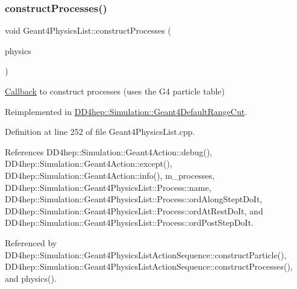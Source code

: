 \subsubsection{\texorpdfstring{construct\+Processes()}{constructProcesses()}}
{\footnotesize\ttfamily void Geant4\+Physics\+List\+::construct\+Processes (\begin{DoxyParamCaption}\item[{G4\+V\+User\+Physics\+List $\ast$}]{physics }\end{DoxyParamCaption})\hspace{0.3cm}{\ttfamily [virtual]}}



\hyperlink{class_d_d4hep_1_1_callback}{Callback} to construct processes (uses the G4 particle table) 



Reimplemented in \hyperlink{class_d_d4hep_1_1_simulation_1_1_geant4_default_range_cut_a5625f1bf8f0c47bb6b29c73ce3e590eb}{D\+D4hep\+::\+Simulation\+::\+Geant4\+Default\+Range\+Cut}.



Definition at line 252 of file Geant4\+Physics\+List.\+cpp.



References D\+D4hep\+::\+Simulation\+::\+Geant4\+Action\+::debug(), D\+D4hep\+::\+Simulation\+::\+Geant4\+Action\+::except(), D\+D4hep\+::\+Simulation\+::\+Geant4\+Action\+::info(), m\+\_\+processes, D\+D4hep\+::\+Simulation\+::\+Geant4\+Physics\+List\+::\+Process\+::name, D\+D4hep\+::\+Simulation\+::\+Geant4\+Physics\+List\+::\+Process\+::ord\+Along\+Stept\+Do\+It, D\+D4hep\+::\+Simulation\+::\+Geant4\+Physics\+List\+::\+Process\+::ord\+At\+Rest\+Do\+It, and D\+D4hep\+::\+Simulation\+::\+Geant4\+Physics\+List\+::\+Process\+::ord\+Post\+Step\+Do\+It.



Referenced by D\+D4hep\+::\+Simulation\+::\+Geant4\+Physics\+List\+Action\+Sequence\+::construct\+Particle(), D\+D4hep\+::\+Simulation\+::\+Geant4\+Physics\+List\+Action\+Sequence\+::construct\+Processes(), and physics().

\hypertarget{class_d_d4hep_1_1_simulation_1_1_geant4_physics_list_a938fd59bb0072ba9c304828aeb6e267b}{}\label{class_d_d4hep_1_1_simulation_1_1_geant4_physics_list_a938fd59bb0072ba9c304828aeb6e267b} 
